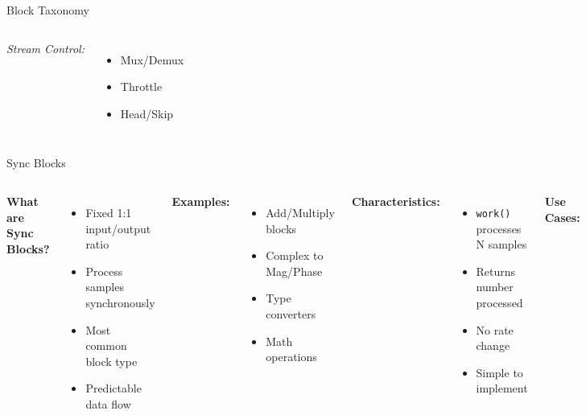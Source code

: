 \documentclass[aspectratio=169,11pt]{beamer}
\begin{document}
\begin{frame}{Block Taxonomy}
\begin{columns}[T]
\textit{Stream Control:}
\begin{itemize}
\setlength\itemsep{0em}
    \item Mux/Demux
    \item Throttle
    \item Head/Skip
\end{itemize}
\end{columns}
\end{frame}

\begin{frame}{Sync Blocks}
\begin{columns}
\textbf{What are Sync Blocks?}
\begin{itemize}
    \item Fixed 1:1 input/output ratio
    \item Process samples synchronously
    \item Most common block type
    \item Predictable data flow
\end{itemize}

\vspace{0.3cm}
\textbf{Examples:}
\begin{itemize}
    \item Add/Multiply blocks
    \item Complex to Mag/Phase
    \item Type converters
    \item Math operations
\end{itemize}

\textbf{Characteristics:}
\begin{itemize}
    \item \texttt{work()} processes N samples
    \item Returns number processed
    \item No rate change
    \item Simple to implement
\end{itemize}

\vspace{0.3cm}
\textbf{Use Cases:}
\begin{itemize}
    \item Signal arithmetic
    \item Format conversion
    \item Simple filtering
    \item Measurement blocks
\end{itemize}
\end{columns}
\end{frame}
\end{document}
